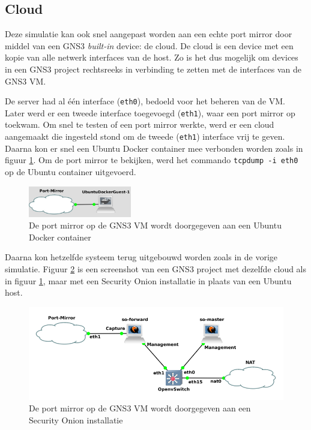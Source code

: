 \documentclass[a4paper,12pt]{report}
\begin{document}
\subsection{Cloud}
Deze simulatie kan ook snel aangepast worden aan een echte port mirror door middel van een GNS3 \emph{built-in} device: de cloud.
De cloud is een device met een kopie van alle netwerk interfaces van de host.
Zo is het dus mogelijk om devices in een GNS3 project rechtsreeks in verbinding te zetten met de interfaces van de GNS3 VM.

De server had al één interface (\lstinline|eth0|), bedoeld voor het beheren van de VM.
Later werd er een tweede interface toegevoegd (\lstinline|eth1|), waar een port mirror op toekwam.
Om snel te testen of een port mirror werkte, werd er een cloud aangemaakt die ingesteld stond om de tweede (\lstinline|eth1|) interface vrij te geven.
Daarna kon er snel een Ubuntu Docker container mee verbonden worden zoals in figuur \ref{fig:gns3-port-mirror-ubuntu}.
Om de port mirror te bekijken, werd het commando \lstinline|tcpdump -i eth0| op de Ubuntu container uitgevoerd.

\begin{figure}[H]
  \centering
  \includegraphics[width=0.4\textwidth]{gns3-port-mirror-ubuntu}
  \caption{De port mirror op de GNS3 VM wordt doorgegeven aan een Ubuntu Docker container}
  \label{fig:gns3-port-mirror-ubuntu}
\end{figure}

Daarna kon hetzelfde systeem terug uitgebouwd worden zoals in de vorige simulatie.
Figuur \ref{fig:gns3-port-mirror-so} is een screenshot van een GNS3 project met dezelfde cloud als in figuur \ref{fig:gns3-port-mirror-ubuntu}, maar met een Security Onion installatie in plaats van een Ubuntu host.

\begin{figure}[H]
  \centering
  \includegraphics[width=\textwidth]{gns3-port-mirror-so}
  \caption{De port mirror op de GNS3 VM wordt doorgegeven aan een Security Onion installatie}
  \label{fig:gns3-port-mirror-so}
\end{figure}
\end{document}
